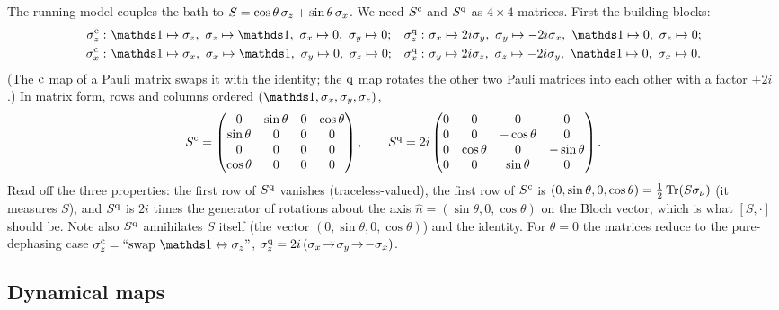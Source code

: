 \begin{exbox}
The running model couples the bath to $S=\cos\theta\,\sigma_z+\sin\theta\,\sigma_x$.
We need $S^{\mathrm{c}}$ and $S^{\mathrm{q}}$ as $4\times4$ matrices.
First the building blocks:
\begin{align}
  \sz^\cl:&\ \Id\mapsto\sz,\ \sz\mapsto\Id,\ \sx\mapsto0,\ \sy\mapsto0; &
  \sz^\qu:&\ \sx\mapsto2i\sy,\ \sy\mapsto-2i\sx,\ \Id\mapsto0,\ \sz\mapsto0;\notag\\
  \sx^\cl:&\ \Id\mapsto\sx,\ \sx\mapsto\Id,\ \sy\mapsto0,\ \sz\mapsto0; &
  \sx^\qu:&\ \sy\mapsto2i\sz,\ \sz\mapsto-2i\sy,\ \Id\mapsto0,\ \sx\mapsto0 .
\end{align}
(The $\mathrm{c}$ map of a Pauli matrix swaps it with the identity; the $\mathrm{q}$ map rotates the other two Pauli matrices into each other with a factor $\pm2i$.)
In matrix form, rows and columns ordered $(\Id,\sx,\sy,\sz)$,
\begin{equation}
  S^{\mathrm{c}}=\begin{pmatrix}0&\sin\theta&0&\cos\theta\\ \sin\theta&0&0&0\\ 0&0&0&0\\ \cos\theta&0&0&0\end{pmatrix},\qquad
  S^{\mathrm{q}}=2i\begin{pmatrix}0&0&0&0\\ 0&0&-\cos\theta&0\\ 0&\cos\theta&0&-\sin\theta\\ 0&0&\sin\theta&0\end{pmatrix}.
  \label{eq:SclSqu}
\end{equation}
Read off the three properties: the first row of $S^{\mathrm{q}}$ vanishes (traceless-valued), the first row of $S^{\mathrm{c}}$ is $(0,\sin\theta,0,\cos\theta)=\tfrac12\operatorname{Tr}(S\sigma_\nu)$ (it measures $S$), and $S^{\mathrm{q}}$ is $2i$ times the generator of rotations about the axis $\hat n=(\sin\theta,0,\cos\theta)$ on the Bloch vector, which is what $[S,\cdot]$ should be.
Note also $S^{\mathrm{q}}$ annihilates $S$ itself (the vector $(0,\sin\theta,0,\cos\theta)$) and the identity.
For $\theta=0$ the matrices reduce to the pure-dephasing case $\sz^\cl=\text{``swap }\Id\leftrightarrow\sz\text{''}$, $\sigma_z^{\mathrm{q}}=2i\,(\sigma_x\!\to\!\sigma_y\!\to\!-\sigma_x)$.
\end{exbox}

\subsection{Dynamical maps}

